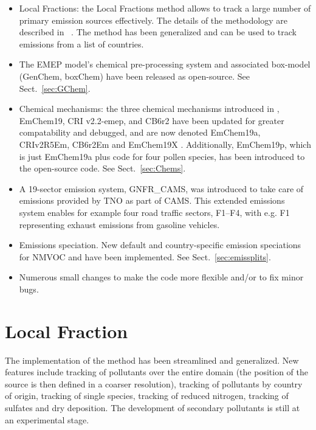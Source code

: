 \begin{itemize}

\item
Local Fractions: the Local Fractions method allows to track a large number of primary
emission sources effectively. The details of the methodology are described
in ~\cite{wind-2020}. The method has been generalized and can be used
to track emissions from a list of countries.

\item
The EMEP model's chemical pre-processing system and associated
box-model (GenChem, boxChem) have been released as open-source.
See Sect.~\ref{sec:GChem}.

\item
Chemical mechanisms: the three chemical mechanisms introduced
in \citet{R2019:ModDev}, EmChem19, CRI v2.2-emep, and CB6r2 have
been updated for greater compatability and debugged, and are now
denoted EmChem19a, CRIv2R5Em, CB6r2Em and EmChem19X \citep[see][in
preparation]{BergstromEmChem2020}.  Additionally, EmChem19p, which is
just EmChem19a plus code for four pollen species, has been introduced
to the open-source code.  See Sect.~\ref{sec:Chems}.

\item
A 19-sector emission system, GNFR\_CAMS, was introduced to take care of
emissions provided by TNO as part of CAMS. This extended emissions system
enables for example four road traffic sectors, F1--F4, with e.g. F1
 representing exhaust emissions from gasoline vehicles.

\item
Emissions speciation. New default and country-specific emission
speciations for NMVOC and \pmfine have been implemented.  See
Sect.~\ref{sec:emissplits}.

\item
Numerous small changes to make the code more flexible and/or to
fix minor bugs.

\end{itemize}

\section{Local Fraction}
\label{sec:LFrac}

The implementation of the method has been streamlined and generalized. New
features include tracking of pollutants over the entire domain
(the position of the source is then defined in a coarser resolution),
tracking of pollutants by country of origin, tracking of single species,
tracking of reduced nitrogen, tracking of sulfates and dry deposition. The
development of secondary pollutants is still at an experimental stage.

